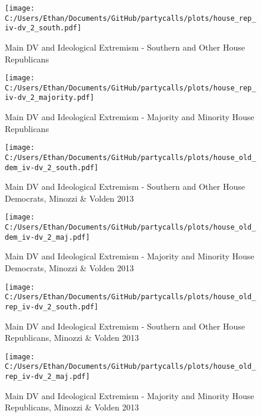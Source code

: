 \documentclass[12pt]{article}
\begin{document}
\begin{figure}[ht]
	\caption{Main DV and Ideological Extremism - Southern and Other House Republicans}
	\texttt{[image: C:/Users/Ethan/Documents/GitHub/partycalls/plots/house\_rep\_iv-dv\_2\_south.pdf]}
\end{figure}

\begin{figure}[ht]
	\caption{Main DV and Ideological Extremism - Majority and Minority House Republicans}
	\texttt{[image: C:/Users/Ethan/Documents/GitHub/partycalls/plots/house\_rep\_iv-dv\_2\_majority.pdf]}
\end{figure}



\begin{figure}[ht]
	\caption{Main DV and Ideological Extremism - Southern and Other House Democrats, Minozzi \& Volden 2013}
	\texttt{[image: C:/Users/Ethan/Documents/GitHub/partycalls/plots/house\_old\_dem\_iv-dv\_2\_south.pdf]}
\end{figure}

\begin{figure}[ht]
	\caption{Main DV and Ideological Extremism - Majority and Minority House Democrats, Minozzi \& Volden 2013}
	\texttt{[image: C:/Users/Ethan/Documents/GitHub/partycalls/plots/house\_old\_dem\_iv-dv\_2\_maj.pdf]}
\end{figure}

\begin{figure}[ht]
	\caption{Main DV and Ideological Extremism - Southern and Other House Republicans, Minozzi \& Volden 2013}
	\texttt{[image: C:/Users/Ethan/Documents/GitHub/partycalls/plots/house\_old\_rep\_iv-dv\_2\_south.pdf]}
\end{figure}

\begin{figure}[ht]
	\caption{Main DV and Ideological Extremism - Majority and Minority House Republicans, Minozzi \& Volden 2013}
	\texttt{[image: C:/Users/Ethan/Documents/GitHub/partycalls/plots/house\_old\_rep\_iv-dv\_2\_maj.pdf]}
\end{figure}
\end{document}
